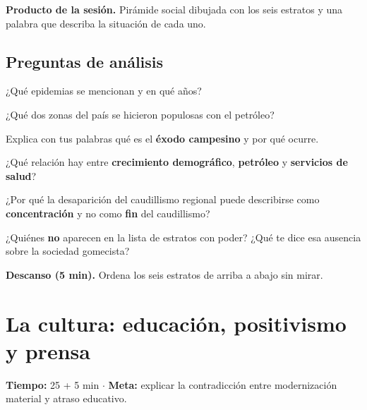\documentclass[12pt, letterpaper]{article}
\makeatletter
\let\mw@oldsection\section
\newcommand{\mw@prepage}{%
  \par
  \ifdim\pagegoal=\maxdimen\else
    \ifdim\dimexpr\pagegoal-\pagetotal\relax<7cm\relax
      \newpage
    \fi
  \fi}
\renewcommand{\section}{\mw@prepage\mw@oldsection}
\newcommand{\metasesion}[2]{%
  \begin{cabecerasesion}
    \small
    \textbf{\color{mwprimario}Tiempo:} #1 \quad$\cdot$\quad
    \textbf{\color{mwprimario}Meta:} #2
  \end{cabecerasesion}%
}
\newcommand{\pausa}[1]{%
  \begin{descanso}
    \small\textbf{\color{mwnaranja}Descanso (5 min).} #1
  \end{descanso}%
}
\makeatother
\begin{document}
\begin{cuadropasos}
  \small
  \textbf{Producto de la sesión.} Pirámide social dibujada con los seis estratos
  y una palabra que describa la situación de cada uno.
\end{cuadropasos}

\subsection*{Preguntas de análisis}
\begin{preguntas}
  \item \facil{} ¿Qué epidemias se mencionan y en qué años?
  \item \facil{} ¿Qué dos zonas del país se hicieron populosas con el petróleo?
  \item \medio{} Explica con tus palabras qué es el \textbf{éxodo campesino} y por
        qué ocurre.
  \item \dificil{} ¿Qué relación hay entre \textbf{crecimiento demográfico},
        \textbf{petróleo} y \textbf{servicios de salud}?
  \item \dificil{} ¿Por qué la desaparición del caudillismo regional puede
        describirse como \textbf{concentración} y no como \textbf{fin} del
        caudillismo?
  \item \muyDificil{} ¿Quiénes \textbf{no} aparecen en la lista de estratos con
        poder? ¿Qué te dice esa ausencia sobre la sociedad gomecista?
\end{preguntas}

\pausa{Ordena los seis estratos de arriba a abajo sin mirar.}

\section{La cultura: educación, positivismo y prensa}

\metasesion{25 + 5 min}{explicar la contradicción entre modernización material y
atraso educativo.}
\end{document}
